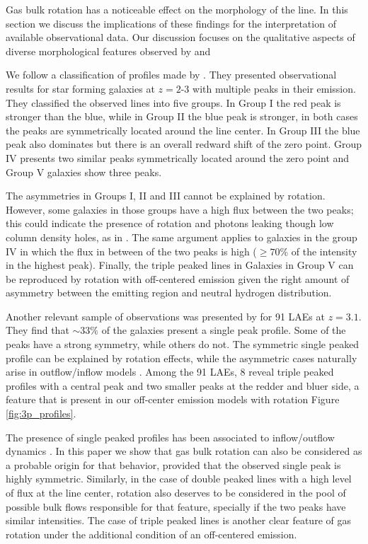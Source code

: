 \documentclass{emulateapj}
\newcommand{\ly}{{\ifmmode{{\rm Ly}\alpha~}\else{Ly$\alpha$~}\fi}}
\begin{document}
Gas bulk rotation has a noticeable effect on the morphology of the
 \ly line. In this section we discuss the implications of these
 findings for the interpretation of available observational data. Our
 discussion focuses on the qualitative aspects of diverse
 morphological features observed by \cite{Kulas12} and \cite{Yamada2012}


We follow a classification of \ly profiles made by
\cite{Kulas12}. They presented observational results for star forming
galaxies at $z=2$-$3$ with multiple peaks in their \ly emission.
They classified the observed lines into five groups. In Group I the
red peak is stronger than the blue, while in Group II the blue peak is
stronger, in both cases the peaks are symmetrically located around the
line center. In Group III the blue peak also dominates but there is an
overall redward shift of the zero point. Group IV presents two similar
peaks symmetrically located around the zero point and Group V galaxies show
three peaks. 

The asymmetries in Groups I, II  and III cannot be explained by
rotation. However, some galaxies in those groups have a high flux between
the two peaks; this could indicate the presence of rotation 
and \ly photons leaking though low column density holes, as in \cite{Behrens2014}. The same argument applies to galaxies in the group IV in which the flux
in between of the two peaks is high ($ \geq 70 \%$ of the intensity in
the highest peak). Finally, the triple peaked lines in Galaxies in
Group V can be reproduced by rotation with off-centered
emission given the right amount of asymmetry between the emitting
region and neutral hydrogen distribution. 

Another relevant sample of observations was presented by \cite{Yamada2012} 
for 91 LAEs at $z=3.1$. They find that $\sim 33 \%$ of the galaxies present 
a single peak profile. Some of the peaks have a strong symmetry, while
others do not. The symmetric single peaked profile can be explained by
rotation effects, while the asymmetric cases naturally arise in
outflow/inflow models \citep{Ahn2014,Verhamme2008, Dijkstra06}. Among the 91
LAEs, 8 reveal triple peaked profiles with a central peak and two
smaller peaks at the redder and bluer side, a feature that is present
in our off-center emission models with rotation Figure \ref{fig:3p_profiles}. 

The presence of single peaked profiles has been associated to
inflow/outflow dynamics \citep{Verhamme06,DijkstraKramer}. In this
paper we show that gas bulk rotation can also be considered as a
probable origin for that behavior, provided that the observed single peak is highly
symmetric. Similarly, in the case of double peaked lines with a high
level of flux at the line center, rotation also deserves to be considered in
the pool of possible bulk flows responsible for that feature,
specially if the two peaks have similar intensities. The case of
triple peaked lines is another clear feature of gas rotation under the
additional condition of an off-centered emission. 
\end{document}
